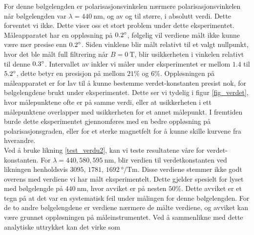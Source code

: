 \documentclass[%
 reprint,
 amsmath,amssymb,
 aps,
 norsk,
]{revtex4-1}
\begin{document}
For denne bølgelengden er polarisasjonsvinkelen nærmere polarisasjonsvinkelen når bølgelengden var $\lambda=\SI{440}{\nano\meter}$, og av og til større, i absolutt verdi. Dette forventet vi ikke. Dette viser oss et stort problem under dette eksperimentet. Måleapparatet har en oppløsning på $0.2\degree$, følgelig vil verdiene målt ikke kunne være mer presise enn $0.2\degree$. Siden vinklene blir målt relativt til et valgt nullpunkt, hvor det ble målt full filtrering når $B=\SI{0}{\tesla}$, blir usikkerheten i vinkelen relativt til denne $0.3\degree$. Intervallet av inkler vi måler under eksperimentet er mellom $1.4$ til $5.2\degree$, dette betyr en presisjon på mellom $21\%$ og $6\%$. Oppløsningen på måleapparatet er for lav til å kunne bestemme verdet-konstanten presist nok, for bølgelengdene brukt under eksperimentet. Dette ser vi tydelig i figur \vref{fig_verdet}, hvor målepunktene ofte er på samme verdi, eller at usikkerheten i ett målepunktene overlapper med usikkerheten for et annet målepunkt. I fremtiden burde dette eksperimentet gjennomføres med en bedre oppløsning på polarisasjonsgraden, eller for et sterke magnetfelt for å kunne skille kurvene fra hverandre.\\
Ved å bruke likning \eqref{test_verdu2}, kan vi teste resultatene våre for verdet-konstanten. For $\lambda = 440, 580, \SI{595}{\nano\meter}$, blir verdien til verdetkonstanten ved likningen henholdsvis $3095$, $1781$, $\SI{1692}{\degree/\tesla\meter}$. Disse verdiene stemmer ikke godt overens med verdiene vi har målt eksperimentelt. Dette gjelder spesielt for lyset med bølgelengde på $\SI{440}{\nano\meter}$, hvor avviket er på nesten $50\%$. Dette avviket er et tegn på at det var en systematisk feil under målingen for denne bølgelengden. For de to andre bølgelengdene er verdiene nærmere de målte verdiene, og avviket kan være grunnet oppløsningen på måleinstrumentet. Ved å sammenlikne med dette analytiske uttrykket kan det virke som
\end{document}
